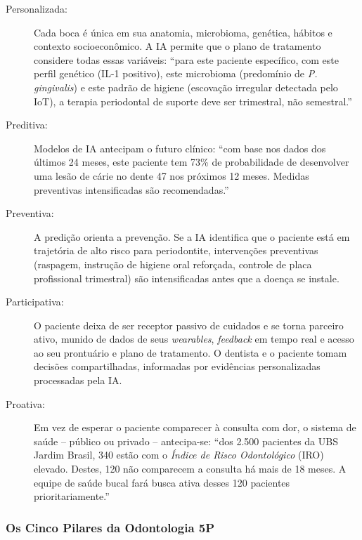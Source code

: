 \begin{description}
  \item[Personalizada:] Cada boca é única em sua anatomia, microbioma, genética,
    hábitos e contexto socioeconômico. A IA permite que o plano de tratamento
    considere todas essas variáveis: ``para este paciente específico, com este
    perfil genético (IL-1 positivo), este microbioma (predomínio de \textit{P.
    gingivalis}) e este padrão de higiene (escovação irregular detectada pelo
    IoT), a terapia periodontal de suporte deve ser trimestral, não semestral.''

  \item[Preditiva:] Modelos de IA antecipam o futuro clínico: ``com base nos
    dados dos últimos 24 meses, este paciente tem 73\% de probabilidade de
    desenvolver uma lesão de cárie no dente 47 nos próximos 12 meses. Medidas
    preventivas intensificadas são recomendadas.''

  \item[Preventiva:] A predição orienta a prevenção. Se a IA identifica que o
    paciente está em trajetória de alto risco para periodontite, intervenções
    preventivas (raspagem, instrução de higiene oral reforçada, controle de
    placa profissional trimestral) são intensificadas antes que a doença se
    instale.

  \item[Participativa:] O paciente deixa de ser receptor passivo de cuidados
    e se torna parceiro ativo, munido de dados de seus \textit{wearables},
    \textit{feedback} em tempo real e acesso ao seu prontuário e plano de
    tratamento. O dentista e o paciente tomam decisões compartilhadas,
    informadas por evidências personalizadas processadas pela IA.

  \item[Proativa:] Em vez de esperar o paciente comparecer à consulta com dor,
    o sistema de saúde -- público ou privado -- antecipa-se: ``dos 2.500
    pacientes da UBS Jardim Brasil, 340 estão com o \textit{Índice de Risco
    Odontológico} (IRO) elevado. Destes, 120 não comparecem a consulta há mais
    de 18 meses. A equipe de saúde bucal fará busca ativa desses 120 pacientes
    prioritariamente.''
\end{description}

\subsubsection{Os Cinco Pilares da Odontologia 5P}

